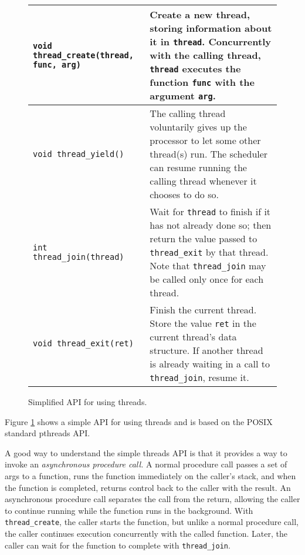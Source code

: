 \documentclass{article}
\begin{document}
\begin{figure}[h]
    \centering
    \begin{tabular}{|l|p{10cm}|}
        \hline %
        \texttt{void thread\_create(thread, func, arg)} & Create a new thread, storing information about it in \texttt{thread}. Concurrently with the calling thread, \texttt{thread} executes the function \texttt{func} with the argument \texttt{arg}.                  \\
        \hline %
        \texttt{void thread\_yield()}                   & The calling thread voluntarily gives up the processor to let some other thread(s) run. The scheduler can resume running the calling thread whenever it chooses to do so.                                         \\
        \hline %
        \texttt{int thread\_join(thread)}               & Wait for \texttt{thread} to finish if it has not already done so; then return the value passed to \texttt{thread\_exit} by that thread. Note that \texttt{thread\_join} may be called only once for each thread. \\
        \hline %
        \texttt{void thread\_exit(ret)}                 & Finish the current thread. Store the value \texttt{ret} in the current thread’s data structure. If another thread is already waiting in a call to \texttt{thread\_join}, resume it.                              \\
        \hline %
    \end{tabular}
    \caption{Simplified API for using threads.}
    \label{fig:thread_api}
\end{figure}

Figure \ref{fig:thread_api} shows a simple API for using threads and is based on the POSIX standard pthreads API.

A good way to understand the simple threads API is that it provides a way to invoke an \textit{asynchronous procedure call.} A normal procedure call passes a set of args to a function, runs the function immediately on the caller's stack, and when the function is completed, returns control back to the caller with the result. An asynchronous procedure call separates the call from the return, allowing the caller to continue running while the function runs in the background. With \texttt{thread\_create}, the caller starts the function, but unlike a normal procedure call, the caller continues execution concurrently with the called function. Later, the caller can wait for the function to complete with \texttt{thread\_join}.
\end{document}
